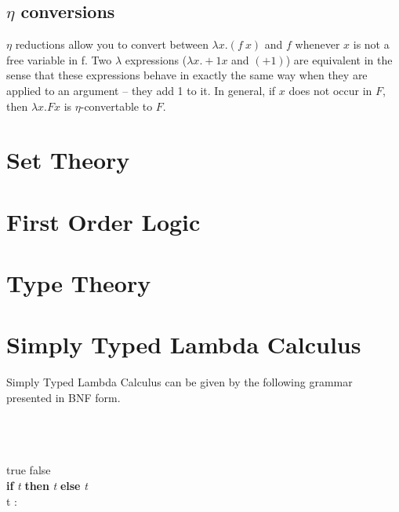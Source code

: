 \documentclass[a4paper,11pt]{article}
\begin{document}
\subsection{$\eta$ conversions}
$\eta$ reductions allow you to convert between $\lambda x . (f \ x)$ and $f$ whenever $x$ is not a free variable 
in f. Two $\lambda$ expressions ($\lambda x . + 1 x$ and $(+ 1)$) are equivalent in the sense that these expressions behave in exactly the same way 
when they are applied to an argument -- they add 1 to it. In general, if $x$ does not occur in $F$, then $\lambda x . F x$ is $\eta$-convertable to $F$.

\section{Set Theory}

\section{First Order Logic}

\section{Type Theory}


\section{\bf{Simply Typed Lambda Calculus}}
Simply Typed Lambda Calculus can be given by the following grammar presented in BNF form. 
\begin{bnf*}
   \bnfsk {}  \\ 
  \bnfmore \bnfor {}  \\
  \bnfmore \bnfor {}  \\ 
  \bnfmore \bnfor true \bnfor false \\ 
  \bnfmore \bnfor \textbf{if} \textit{ t } \textbf{then} \textit{ t } \textbf{else} \textit{ t } \\ 
  \bnfmore \bnfor t : \tau \\ 
  \bnfprod{$\tau$} 
   \\ 
  \bnfmore \bnfor \bnfpn{$\tau \rightarrow \tau$} 
\end{bnf*}
\end{document}
